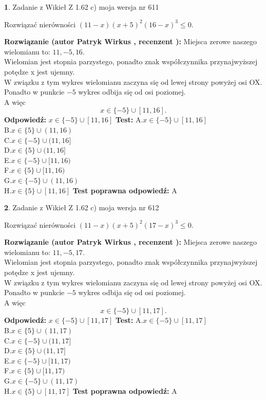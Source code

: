 \documentclass[12pt, a4paper]{article}
\theoremstyle{definition} %
\newtheorem{zad}{}
\newcommand{\zadStart}[1]{\begin{zad}#1\newline}
\newcommand{\zadStop}{\end{zad}}
\newcommand{\rozwStart}[2]{\noindent \textbf{Rozwiązanie (autor #1 , recenzent #2): }\newline}
\newcommand{\rozwStop}{\newline}
\newcommand{\odpStart}{\noindent \textbf{Odpowiedź:}\newline}
\newcommand{\odpStop}{\newline}
\newcommand{\testStart}{\noindent \textbf{Test:}\newline}
\newcommand{\testStop}{\newline}
\newcommand{\kluczStart}{\noindent \textbf{Test poprawna odpowiedź:}\newline}
\newcommand{\kluczStop}{\newline}
\begin{document}
\zadStart{Zadanie z Wikieł Z 1.62 c) moja wersja nr 611}

Rozwiązać nierówności $(11-x)(x+5)^{2}(16-x)^{3}\le0$.
\zadStop
\rozwStart{Patryk Wirkus}{}
Miejsca zerowe naszego wielomianu to: $11, -5, 16$.\\
Wielomian jest stopnia parzystego, ponadto znak współczynnika przy\linebreak najwyższej potędze x jest ujemny.\\ W związku z tym wykres wielomianu zaczyna się od lewej strony powyżej osi OX.\\
Ponadto w punkcie $-5$ wykres odbija się od osi poziomej.\\
A więc $$x \in \{-5\} \cup [11,16].$$
\rozwStop
\odpStart
$x \in \{-5\} \cup [11,16]$
\odpStop
\testStart
A.$x \in \{-5\} \cup [11,16]$\\
B.$x \in \{5\} \cup (11,16)$\\
C.$x \in \{-5\} \cup (11,16]$\\
D.$x \in \{5\} \cup (11,16]$\\
E.$x \in \{-5\} \cup [11,16)$\\
F.$x \in \{5\} \cup [11,16)$\\
G.$x \in \{-5\} \cup (11,16)$\\
H.$x \in \{5\} \cup [11,16]$
\testStop
\kluczStart
A
\kluczStop



\zadStart{Zadanie z Wikieł Z 1.62 c) moja wersja nr 612}

Rozwiązać nierówności $(11-x)(x+5)^{2}(17-x)^{3}\le0$.
\zadStop
\rozwStart{Patryk Wirkus}{}
Miejsca zerowe naszego wielomianu to: $11, -5, 17$.\\
Wielomian jest stopnia parzystego, ponadto znak współczynnika przy\linebreak najwyższej potędze x jest ujemny.\\ W związku z tym wykres wielomianu zaczyna się od lewej strony powyżej osi OX.\\
Ponadto w punkcie $-5$ wykres odbija się od osi poziomej.\\
A więc $$x \in \{-5\} \cup [11,17].$$
\rozwStop
\odpStart
$x \in \{-5\} \cup [11,17]$
\odpStop
\testStart
A.$x \in \{-5\} \cup [11,17]$\\
B.$x \in \{5\} \cup (11,17)$\\
C.$x \in \{-5\} \cup (11,17]$\\
D.$x \in \{5\} \cup (11,17]$\\
E.$x \in \{-5\} \cup [11,17)$\\
F.$x \in \{5\} \cup [11,17)$\\
G.$x \in \{-5\} \cup (11,17)$\\
H.$x \in \{5\} \cup [11,17]$
\testStop
\kluczStart
A
\kluczStop
\end{document}
